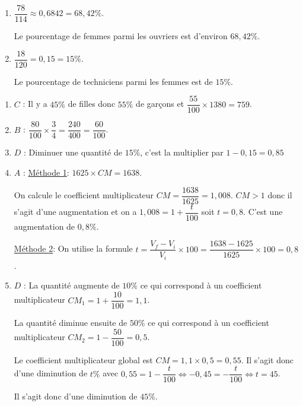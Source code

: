 \documentclass[a4paper]{article}
\begin{document}
\begin{exercice}{}{}
\begin{enumerate}
\begin{enumerate}
            \item $\dfrac{78}{114}\approx0,6842=68,42\%$.
            
            Le pourcentage de femmes parmi les ouvriers est d'environ $68,42\%$.

            \item $\dfrac{18}{120}=0,15=15\%$.
            
            Le pourcentage de techniciens parmi les femmes est de $15\%$. 
            
          \end{enumerate}
        
      \end{enumerate}
   
    \end{exercice}

    \medskip

    \begin{exercice}{}{}
      \begin{enumerate}
        \item $C$ : Il y a $45\%$ de filles donc $55\%$ de garçons et $\dfrac{55}{100}\times 1380=759$.
        \item $B$ : $\dfrac{80}{100}\times \dfrac{3}{4}=\dfrac{240}{400}=\dfrac{60}{100}$.
        \item $D$ : Diminuer une quantité de $15\%$, c'est la multiplier par $1-0,15=0,85$
        \item $A$ : \underline{Méthode 1}: $1625 \times CM = 1638$.
        
        On calcule le coefficient multiplicateur $CM=\dfrac{1638}{1625}=1,008$. $CM>1$ donc il s'agit
        d'une augmentation et on a $1,008=1+\dfrac{t}{100}$ soit $t=0,8$. C'est une augmentation de $0,8\%$.

        \underline{Méthode 2}: On utilise la formule $t=\dfrac{V_f-V_i}{V_i}\times 100=\dfrac{1638-1625}{1625}\times 100 = 0,8$.
 
        \item $D$ : La quantité augmente de $10\%$ ce qui correspond à un coefficient multiplicateur $CM_1=1+\dfrac{10}{100}=1,1$.
        
        La quantité diminue ensuite de $50\%$ ce qui correspond à un coefficient multiplicateur $CM_2=1-\dfrac{50}{100}=0,5$.

        Le coefficient multiplicateur global est $CM=1,1\times 0,5=0,55$. Il s'agit donc d'une diminution de $t\%$ avec $0,55=1-\dfrac{t}{100} \iff -0,45=-\dfrac{t}{100} \iff t=45$.

        Il s'agit donc d'une diminution de $45\%$.
        
     \end{enumerate}
    \end{exercice}
\end{document}
